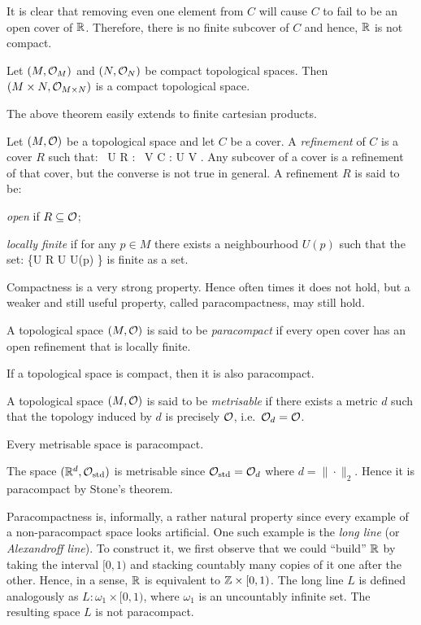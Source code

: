 It is clear that removing even one element from $C$ will cause $C$ to fail to be an open cover of $\mathbb{R}$. Therefore, there is no finite subcover of $C$ and hence, $\mathbb{R}$ is not compact.
\ee

\bt
Let $(M,\mathcal{O}_M)$ and $(N,\mathcal{O}_N)$ be compact topological spaces. Then $(M\times N,\mathcal{O}_{M\times N})$ is a compact topological space.
\et

The above theorem easily extends to finite cartesian products. 

\bd
Let $(M,\mathcal{O})$ be a topological space and let $C$ be a cover. A \emph{refinement} of $C$ is a cover $R$ such that:
\bse
\forall \, U \in R : \exists \, V \in C : U \se V .
\ese
\ed
Any subcover of a cover is a refinement of that cover, but the converse is not true in general. A refinement $R$ is said to be:
\bit
\item \emph{open} if $R\subseteq \mathcal{O}$;
\item \emph{locally finite} if for any $p\in M$ there exists a neighbourhood $U(p)$ such that the set:
\bse
\{U \in R \mid U \cap U(p) \neq \vn\}
\ese
is finite as a set.
\eit

Compactness is a very strong property. Hence often times it does not hold, but a weaker and still useful property, called paracompactness, may still hold.

\bd
A topological space $(M,\mathcal{O})$ is said to be \emph{paracompact} if every open cover has an open refinement that is locally finite.
\ed

\bc
If a topological space is compact, then it is also paracompact.
\ec

\bd
A topological space $(M,\mathcal{O})$ is said to be \emph{metrisable} if there exists a metric $d$ such that the topology induced by $d$ is precisely $\mathcal{O}$, i.e.\ $\mathcal{O}_d=\mathcal{O}$. 
\ed

\bt[Stone]
Every metrisable space is paracompact.
\et

\be
The space $(\mathbb{R}^d,\mathcal{O}_\mathrm{std})$ is metrisable since $\mathcal{O}_\mathrm{std}=\mathcal{O}_d$ where $d = \|\cdot\|_2$. Hence it is paracompact by Stone's theorem.
\ee

\br
Paracompactness is, informally, a rather natural property since every example of a non-paracompact space looks artificial. One such example is the \emph{long line} (or \emph{Alexandroff line}). To construct it, we first observe that we could ``build'' $\mathbb{R}$ by taking the interval $[0,1)$ and stacking countably many copies of it one after the other. Hence, in a sense, $\mathbb{R}$ is equivalent to $\mathbb{Z} \times [0,1)$. The long line $L$ is defined analogously as $L:\omega_1\times [0,1)$, where $\omega_1$ is an uncountably infinite set. The resulting space $L$ is not paracompact.
\er

